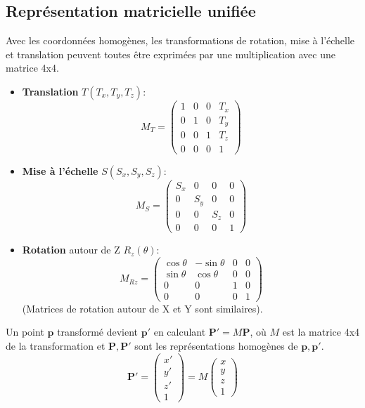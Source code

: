 \subsection{Représentation matricielle unifiée}
Avec les coordonnées homogènes, les transformations de rotation, mise à l'échelle et translation peuvent toutes être exprimées par une multiplication avec une matrice 4x4.
\begin{itemize}
    \item \textbf{Translation} \( T(T_x, T_y, T_z) \):
    \[ M_T = \begin{pmatrix} 1 & 0 & 0 & T_x \\ 0 & 1 & 0 & T_y \\ 0 & 0 & 1 & T_z \\ 0 & 0 & 0 & 1 \end{pmatrix} \]
    \item \textbf{Mise à l'échelle} \( S(S_x, S_y, S_z) \):
    \[ M_S = \begin{pmatrix} S_x & 0 & 0 & 0 \\ 0 & S_y & 0 & 0 \\ 0 & 0 & S_z & 0 \\ 0 & 0 & 0 & 1 \end{pmatrix} \]
    \item \textbf{Rotation} autour de Z \( R_z(\theta) \):
    \[ M_{Rz} = \begin{pmatrix} \cos \theta & -\sin \theta & 0 & 0 \\ \sin \theta & \cos \theta & 0 & 0 \\ 0 & 0 & 1 & 0 \\ 0 & 0 & 0 & 1 \end{pmatrix} \]
    (Matrices de rotation autour de X et Y sont similaires).
\end{itemize}
Un point \( \mathbf{p} \) transformé devient \( \mathbf{p'} \) en calculant \( \mathbf{P'} = M \mathbf{P} \), où \( M \) est la matrice 4x4 de la transformation et \( \mathbf{P}, \mathbf{P'} \) sont les représentations homogènes de \( \mathbf{p}, \mathbf{p'} \).
\[ \mathbf{P'} = \begin{pmatrix} x' \\ y' \\ z' \\ 1 \end{pmatrix} = M \begin{pmatrix} x \\ y \\ z \\ 1 \end{pmatrix} \]
